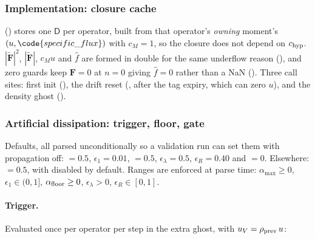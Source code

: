 \subsubsection{Implementation: closure cache}

() stores one $\mathsf{D}$ per
operator, built from that operator's \emph{owning} moment's
$(u, \code{specific\_flux})$ with $c_M = 1$, so the closure does not depend on
$c_{\rm hyp}$. $|\tilde{\boldsymbol{F}}|^2$,
$|\tilde{\boldsymbol{F}}|$, $c_M u$ and $\hat f$ are formed in double for the same
underflow reason (), and zero guards
keep $\boldsymbol{F} = 0$ at $n=0$ giving $\hat f = 0$ rather than a NaN
(). Three call sites: first init
(), the drift reset (, after the
tag expiry, which can zero $u$), and the density ghost
().

\subsubsection{Artificial dissipation: trigger, floor, gate}
\label{sec:isrf-eqdisc-dissipation}

Defaults, all parsed unconditionally so a validation run can set them with
propagation off:  $=0.5$,
 $\epsilon_1 = 0.01$,
 $=0.5$,
 $\epsilon_\lambda = 0.5$,
 $\epsilon_R = 0.40$
and 
$=0$. Elsewhere:  $=0.5$,
with  disabled
by default. Ranges are
enforced at parse time: $\alpha_{\max} \ge 0$,
$\epsilon_1 \in (0,1]$, $\alpha_{\rm floor} \ge 0$,
$\epsilon_\lambda > 0$,
$\epsilon_R \in [0,1]$.

\paragraph{Trigger.} Evaluated once per operator per step in the
extra ghost, with $u_V = \rho_{\rm prev}\, u$:

